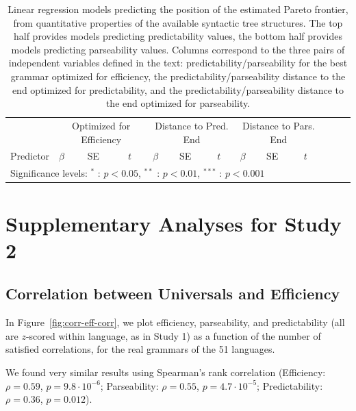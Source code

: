 \documentclass[10pt,twoside,lineno]{article}
\begin{document}
\begin{table}
\centering
\small{
\begin{tabular}{l||lll|lll|lll|lll}
	& \multicolumn{3}{c|}{Optimized for Efficiency} & \multicolumn{3}{c|}{Distance to Pred. End}   & \multicolumn{3}{c|}{Distance to Pars. End}\\
	Predictor & $\beta$ & SE & $t$ & $\beta$ & SE & $t$  & $\beta$ & SE & $t$ \\ \hline \hline

	\multicolumn{10}{l}{Significance levels: $^{*}$ : $p < 0.05$, $^{**}$ : $p < 0.01$, $^{***}$ : $p<0.001$}
\end{tabular}
}
	\caption{Linear regression models predicting the position of the estimated Pareto frontier, from quantitative properties of the available syntactic tree structures. The top half provides models predicting predictability values, the bottom half provides models predicting parseability values. Columns correspond to the three pairs of independent variables defined in the text: predictability/parseability for the best grammar optimized for efficiency, the predictability/parseability distance to the end optimized for predictability, and the predictability/parseability distance to the end optimized for parseability.}\label{tab:corpus-frontier-regressions}
\end{table}





\section{Supplementary Analyses for Study 2}
\subsection{Correlation between Universals and Efficiency}

In Figure~\ref{fig:corr-eff-corr}, we plot efficiency, parseability, and predictability (all are $z$-scored within language, as in Study 1) as a function of the number of satisfied correlations, for the real grammars of the 51 languages.

We found very similar results using Spearman's rank correlation (Efficiency: $\rho=0.59$, $p = 9.8 \cdot 10^{-6}$; Parseability: $\rho=0.55$, $p=4.7 \cdot 10^{-5}$; Predictability: $\rho=0.36$, $p=0.012$).
\end{document}
